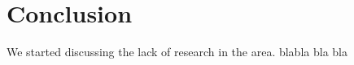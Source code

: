 \section{Conclusion}
\label{sec:Conclusion}
We started discussing the lack of research in the area. blabla bla bla